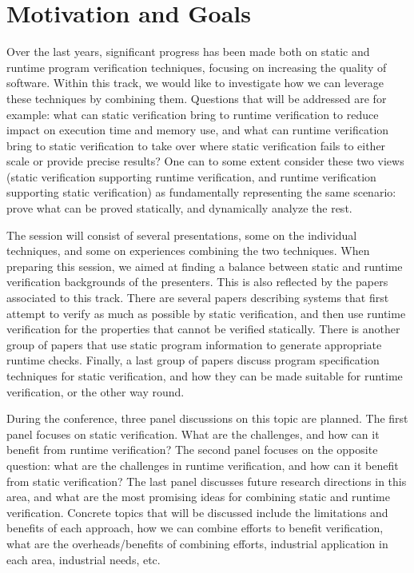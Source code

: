 
\section{Motivation and Goals}

Over the last years, significant progress has been made both on static and runtime program verification techniques, focusing on increasing the quality of software. Within this track, we would like to investigate how we can leverage these techniques by combining them. Questions that will be addressed are for example: what can static verification  bring to runtime verification 
to reduce impact on execution time and memory use, and what can runtime verification bring to static verification to take over where static verification fails to either scale or provide precise results? One can to some extent consider these two views (static verification supporting runtime verification, and runtime verification supporting static verification) as fundamentally representing the same scenario: prove what can be proved statically, and dynamically analyze the rest. 

The session will consist of several presentations, some on the individual techniques, and some on experiences combining the two techniques. When preparing this session, we aimed at finding a balance between static and runtime verification backgrounds of the presenters. This is also reflected by the papers associated to this track. There are several papers describing systems that first attempt to verify as much as possible by static verification, and then use runtime verification for the properties that cannot be verified statically. There is another group of papers that use static program information to generate appropriate runtime checks. Finally, a last group of papers discuss program specification techniques for static verification, and how they can be made suitable for runtime verification, or the other way round.

During the conference, three panel discussions on this topic are planned. The first panel focuses on static verification. What are the challenges, and how can it benefit from runtime verification? The second panel focuses on the opposite question: what are the challenges in runtime verification, and how can it benefit from static verification? The last panel  discusses future research directions in this area, and what are the most promising ideas for combining static and runtime verification. Concrete topics that will be discussed include the limitations and benefits of each approach, how we can combine efforts to benefit verification, what are the overheads/benefits of combining efforts, industrial application in each area, industrial needs, etc.



